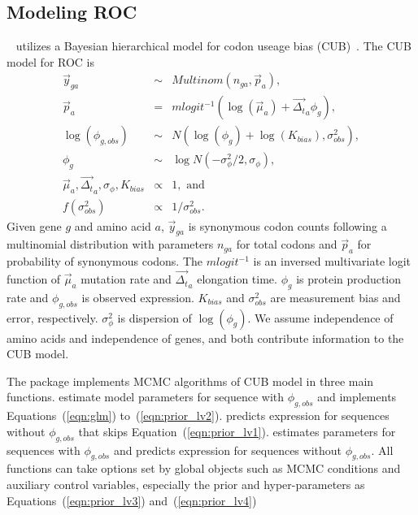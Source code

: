 \subsection[Modeling ROC]{Modeling ROC}
\label{sec:roc_model}

~\citep{Chen2014cubfitspackage} utilizes a
Bayesian hierarchical model for codon useage bias
(CUB)~\citep{Gilchrist2007,Shah2011,Wallace2013,Gilchrist2014}.
The CUB model for ROC is
\begin{eqnarray}
\vec{y}_{ga} &
    \sim & Multinom(n_{ga}, \vec{p}_{a}),
    \label{eqn:glm} \\
\vec{p}_{a} & = &
    mlogit^{-1}(\log(\vec{\mu}_{a}) + \vec{\Delta_t}_{a} \phi_g),
    \label{eqn:link_fcn} \\
\log(\phi_{g, obs}) & \sim &
    N(\log(\phi_g) + \log(K_{bias}), \sigma^2_{obs}),
    \label{eqn:prior_lv1} \\
\phi_g & \sim &
    \log N(-\sigma^2_{\phi}/2, \sigma_{\phi}),
    \label{eqn:prior_lv2} \\
\vec{\mu}_{a}, \vec{\Delta_t}_{a}, \sigma_{\phi}, K_{bias} & \propto &
    1, \mbox{ and }
    \label{eqn:prior_lv3} \\
f(\sigma^2_{obs}) & \propto &
    1 / \sigma^2_{obs} .
    \label{eqn:prior_lv4}
\end{eqnarray}
Given gene $g$ and amino acid $a$,
$\vec{y}_{ga}$ is synonymous codon counts
following a multinomial distribution with parameters
$n_{ga}$ for total codons and $\vec{p}_{a}$ for probability of
synonymous codons.
The $mlogit^{-1}$ is an inversed multivariate logit
function of $\vec{\mu}_{a}$ mutation rate and $\vec{\Delta_t}_{a}$
elongation time. $\phi_g$ is protein production rate 
and $\phi_{g,obs}$ is observed expression.
$K_{bias}$ and $\sigma^2_{obs}$ are measurement bias and
error, respectively. $\sigma^2_{\phi}$ is dispersion of $\log(\phi_g)$.
We assume independence of amino acids and independence of genes, and both
contribute information to the CUB model.

The package implements MCMC algorithms of CUB model in three main functions.
 estimate model parameters for sequence with $\phi_{g,obs}$
and implements Equations~(\ref{eqn:glm}) to~(\ref{eqn:prior_lv2}).
 predicts expression for sequences without $\phi_{g,obs}$
that skips Equation~(\ref{eqn:prior_lv1}).
 estimates parameters for sequences with $\phi_{g,obs}$
and predicts expression for sequences without $\phi_{g,obs}$.
All functions can take options set by global objects such as
MCMC conditions and auxiliary control variables, especially the
prior and hyper-parameters as Equations~(\ref{eqn:prior_lv3})
and~(\ref{eqn:prior_lv4})

